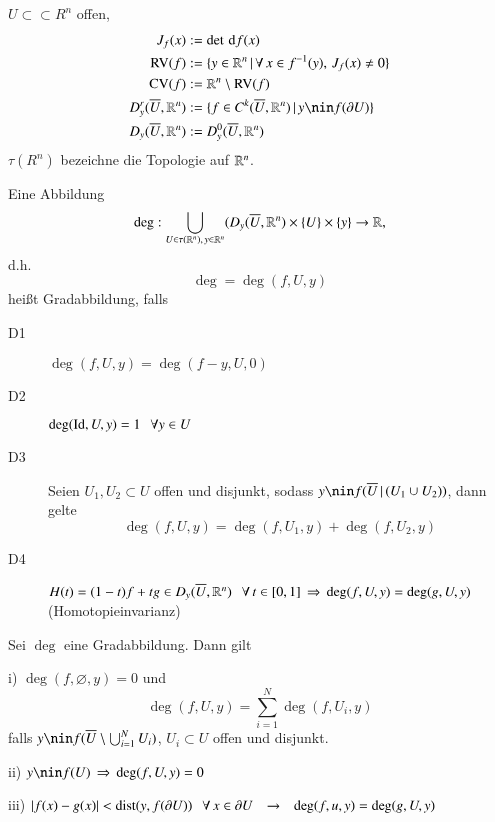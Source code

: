 $U\subset\subset R^n$ offen,
\begin{align*}
    J_f(x)&:=\det \d f(x)\\
    \RV(f)&:=\{ y\in \R^n \,| \, \forall \, x\in f^{-1}(y), \, J_f(x)\neq 0 \}\\
    \CV(f)&:= \R^n \setminus \RV(f)\\
    D_y^r(\ol U, \R^n)&:=\{f\in C^k(\ol U, \R^n)\,|\,y\nin f(\partial U)\}\\
    D_y(\ol U, \R^n)&:=D_y^0(\ol U, \R^n)
\end{align*}
$\tau(R^n)$ bezeichne die Topologie auf $\mathbb{R}^n$.
\begin{defi}
    Eine Abbildung
    \[
        \deg: \bigcup_{U\in \tau(\mathbb{R}^n),\, y\in \mathbb{R}^n} (D_y(\overline U, \mathbb{R}^n)\times \{U\}\times \{y\}\rightarrow \mathbb{R},
    \]
    d.h.
    \[
        \deg=\deg(f,U,y) 
    \]
    heißt Gradabbildung, falls
    \begin{description}
        \item[D1]
        $\deg(f,U,y)=\deg(f-y,U,0)$
        \item[D2]
        $\deg(\mathrm{Id},U,y)=1 \hspace{.25cm} \forall y\in U$
        \item[D3]
        Seien $U_1,U_2\subset U$ offen und disjunkt, sodass $y\nin f(\ol U\,|\,(U_1\cup U_2))$, dann
        gelte
        \[
            \deg(f,U,y)=\deg(f,U_1,y)+\deg(f,U_2,y)
        \]
        \item[D4]
        $H(t)=(1-t)f+tg \in D_y(\overline U,\mathbb{R}^n) \hspace{.25cm} \forall \, t\in [0,1]\, \Rightarrow \, \deg(f,U,y)=\deg(g,U,y)$
        (Homotopieinvarianz)
\end{description}
\end{defi}

\begin{theorem}
    Sei $\deg$ eine Gradabbildung. Dann gilt
    \begin{description}
        \item{i)}
        $\deg(f,\varnothing,y)=0$ und
        \[
            \deg(f,U,y)=\sum_{i=1}^N \deg(f,U_i,y)
        \]
        falls $y\nin f(\ol U\setminus\bigcup_{i=1}^NU_i)$, $U_i\subset U$ offen und disjunkt.
        \item{ii)}
        $y\nin f(U) \, \Ra \, \deg(f,U,y)=0$
        \item{iii)}
        $|f(x)-g(x)|<\mathrm{dist}(y,f(\partial U)) \hspace{.25cm} \forall \, x\in \partial U \hspace{.25cm} \rightarrow \hspace{.25cm} \deg(f,u,y)
        =\deg(g,U,y)$
    \end{description}
\end{theorem}

